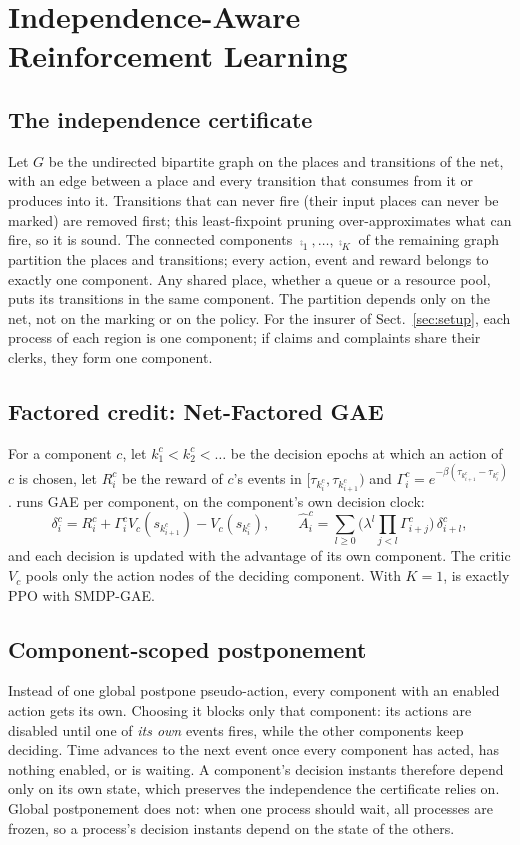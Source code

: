 \section{Independence-Aware Reinforcement Learning}\label{sec:method}

\subsection{The independence certificate}\label{sec:certificate}
Let $G$ be the undirected bipartite graph on the places and transitions of the net,
with an edge between a place and every transition that consumes from it or produces
into it. Transitions that can never fire (their input places can never be marked)
are removed first; this least-fixpoint pruning over-approximates what can fire, so it
is sound. The connected components $\comp_1,\dots,\comp_K$ of the remaining graph
partition the places and transitions; every action, event and reward belongs to
exactly one component. Any shared place, whether a queue or a resource pool, puts its
transitions in the same component. The partition depends only on the net, not on the
marking or on the policy. For the insurer of Sect.~\ref{sec:setup}, each process of
each region is one component; if claims and complaints share their clerks, they form
one component.

\subsection{Factored credit: Net-Factored GAE}\label{sec:nfgae}
For a component $c$, let $k^c_1<k^c_2<\dots$ be the decision epochs at which an action
of $c$ is chosen, let $R^c_i$ be the reward of $c$'s events in
$[\tau_{k^c_i},\tau_{k^c_{i+1}})$ and $\Gamma^c_i = e^{-\beta(\tau_{k^c_{i+1}}-\tau_{k^c_i})}$.
\nfgae{} runs GAE per component, on the component's own decision clock:
\begin{equation}
  \delta^c_i = R^c_i + \Gamma^c_i V_c(s_{k^c_{i+1}}) - V_c(s_{k^c_i}), \qquad
  \hat A^c_i = \sum_{l\ge 0} \Big(\lambda^l \prod_{j<l}\Gamma^c_{i+j}\Big)\, \delta^c_{i+l},
\end{equation}
and each decision is updated with the advantage of its own component. The critic $V_c$
pools only the action nodes of the deciding component. With $K=1$, \nfgae{} is exactly
PPO with SMDP-GAE.

\subsection{Component-scoped postponement}\label{sec:postpone}
Instead of one global postpone pseudo-action, every component with an enabled action
gets its own. Choosing it blocks only that component: its actions are disabled until
one of \emph{its own} events fires, while the other components keep deciding. Time
advances to the next event once every component has acted, has nothing enabled, or
is waiting. A component's decision instants therefore depend only on its own state,
which preserves the independence the certificate relies on. Global postponement does
not: when one process should wait, all processes are frozen, so a process's decision
instants depend on the state of the others. 

